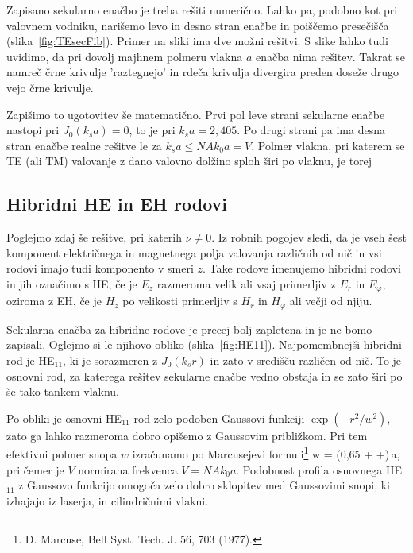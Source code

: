 Zapisano sekularno enačbo je treba rešiti numerično. Lahko pa, podobno kot pri valovnem
vodniku, narišemo levo in desno stran enačbe in poiščemo
presečišča (slika~\ref{fig:TEsecFib}). Primer na sliki ima dve možni rešitvi. S slike lahko 
tudi uvidimo, da pri dovolj majhnem polmeru vlakna $a$ enačba nima rešitev. Takrat se namreč
črne krivulje 'raztegnejo' in rdeča krivulja divergira preden doseže drugo vejo črne krivulje.

Zapišimo to ugotovitev še matematično. Prvi pol leve strani sekularne enačbe nastopi pri 
$J_0 (k_s a)  = 0$, to je pri $k_s a= 2,405$. 
Po drugi strani pa ima desna stran enačbe realne rešitve le za $k_s a \le NA k_0 a = V$.
Polmer vlakna, pri katerem se TE (ali TM) valovanje z dano valovno dolžino sploh širi po 
vlaknu, je torej 

\subsection*{Hibridni HE in EH rodovi}
Poglejmo zdaj še rešitve, pri katerih $\nu \neq 0$. Iz robnih pogojev sledi, da je 
vseh šest komponent električnega in magnetnega polja valovanja različnih od nič in vsi rodovi
imajo tudi komponento v smeri $z$. Take rodove imenujemo hibridni rodovi in jih 
označimo s HE, če je $E_z$ razmeroma velik ali vsaj primerljiv z $E_r$ in $E_\varphi$, 
oziroma z EH, če je $H_z$ po velikosti primerljiv s $H_r$ in $H_\varphi$ ali večji od njiju. 

Sekularna enačba za hibridne rodove je precej bolj zapletena in je ne bomo zapisali. 
Oglejmo si le njihovo obliko (slika~\ref{fig:HE11}). Najpomembnejši hibridni rod je HE$_{11}$, 
ki je sorazmeren z $J_0(k_sr)$ in zato v središču različen od nič. 
To je osnovni rod, za katerega rešitev sekularne enačbe vedno obstaja in se
zato širi po še tako tankem vlaknu. 

Po obliki je osnovni HE$_{11}$ rod zelo podoben Gaussovi funkciji $\exp(-r^2/w^2)$,
zato ga lahko razmeroma dobro opišemo z Gaussovim približkom. 
Pri tem efektivni polmer snopa
$w$ izračunamo po Marcusejevi formuli\footnote{D. Marcuse, Bell Syst. Tech. J. 56, 703 (1977).}
\beq 
w = (0,65 + +)\,a,
\label{Marcuse}
\eeq
pri čemer je $V$ normirana frekvenca $V = NA k_0 a$. Podobnost profila osnovnega
HE$_{11}$ z Gaussovo funkcijo omogoča zelo dobro sklopitev med Gaussovimi
snopi, ki izhajajo iz laserja, in cilindričnimi vlakni.

